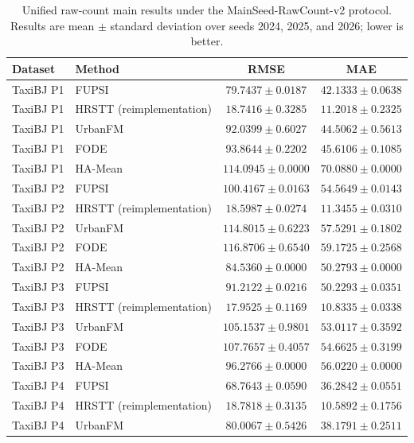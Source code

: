 \begin{table}[!htbp]
\centering
\caption{Unified raw-count main results under the MainSeed-RawCount-v2 protocol. Results are mean $\pm$ standard deviation over seeds 2024, 2025, and 2026; lower is better.}
\label{tab:unified-main-results}
\small
\setlength{\tabcolsep}{8pt}
\begin{tabular}{llcc}
\toprule
Dataset & Method & RMSE & MAE \\
\midrule
TaxiBJ P1 & FUPSI & \underline{$79.7437\pm0.0187$} & \underline{$42.1333\pm0.0638$} \\
TaxiBJ P1 & HRSTT (reimplementation) & \textbf{$18.7416\pm0.3285$} & \textbf{$11.2018\pm0.2325$} \\
TaxiBJ P1 & UrbanFM & $92.0399\pm0.6027$ & $44.5062\pm0.5613$ \\
TaxiBJ P1 & FODE & $93.8644\pm0.2202$ & $45.6106\pm0.1085$ \\
TaxiBJ P1 & HA-Mean & $114.0945\pm0.0000$ & $70.0880\pm0.0000$ \\
\addlinespace
TaxiBJ P2 & FUPSI & $100.4167\pm0.0163$ & $54.5649\pm0.0143$ \\
TaxiBJ P2 & HRSTT (reimplementation) & \textbf{$18.5987\pm0.0274$} & \textbf{$11.3455\pm0.0310$} \\
TaxiBJ P2 & UrbanFM & $114.8015\pm0.6223$ & $57.5291\pm0.1802$ \\
TaxiBJ P2 & FODE & $116.8706\pm0.6540$ & $59.1725\pm0.2568$ \\
TaxiBJ P2 & HA-Mean & \underline{$84.5360\pm0.0000$} & \underline{$50.2793\pm0.0000$} \\
\addlinespace
TaxiBJ P3 & FUPSI & \underline{$91.2122\pm0.0216$} & \underline{$50.2293\pm0.0351$} \\
TaxiBJ P3 & HRSTT (reimplementation) & \textbf{$17.9525\pm0.1169$} & \textbf{$10.8335\pm0.0338$} \\
TaxiBJ P3 & UrbanFM & $105.1537\pm0.9801$ & $53.0117\pm0.3592$ \\
TaxiBJ P3 & FODE & $107.7657\pm0.4057$ & $54.6625\pm0.3199$ \\
TaxiBJ P3 & HA-Mean & $96.2766\pm0.0000$ & $56.0220\pm0.0000$ \\
\addlinespace
TaxiBJ P4 & FUPSI & \underline{$68.7643\pm0.0590$} & \underline{$36.2842\pm0.0551$} \\
TaxiBJ P4 & HRSTT (reimplementation) & \textbf{$18.7818\pm0.3135$} & \textbf{$10.5892\pm0.1756$} \\
TaxiBJ P4 & UrbanFM & $80.0067\pm0.5426$ & $38.1791\pm0.2511$ \\

\end{tabular}
\end{table}
